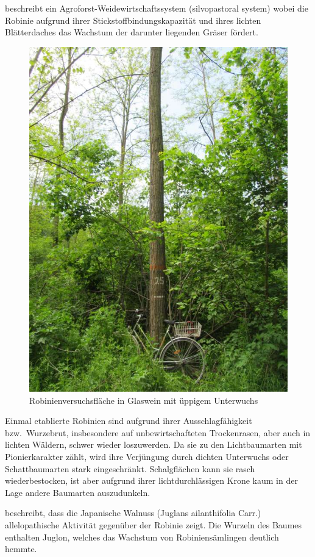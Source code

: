 \documentclass[twocolumn]{scrartcl}
\begin{document}
\citet[p.\,467, 586]{ashton2018silviculture} beschreibt ein
Agroforst-Weidewirtschaftssystem (silvopastoral system) wobei die
Robinie aufgrund ihrer Stickstoffbindungskapazität und ihres lichten
Blätterdaches das Wachstum der darunter liegenden Gräser fördert.

\begin{figure}[htbp]
  \centering
  \includegraphics[width=.9\linewidth]{./bild/GlasweinRobinie2023a}
  \caption{Robinienversuchsfläche in Glaswein mit üppigem Unterwuchs}
  \label{fig:glaswein}
\end{figure}

Einmal etablierte Robinien sind aufgrund ihrer Ausschlagfähigkeit
bzw.\ Wurzebrut, insbesondere auf unbewirtschafteten Trockenrasen, aber
auch in lichten Wäldern, schwer wieder loszuwerden. Da sie zu den
Lichtbaumarten mit Pionierkarakter zählt, wird ihre Verjüngung durch
dichten Unterwuchs oder Schattbaumarten stark
eingeschränkt. Schalgflächen kann sie rasch wiederbestocken, ist aber
aufgrund ihrer lichtdurchlässigen Krone kaum in der Lage andere
Baumarten auszudunkeln.

\cite{jung2010robinie} beschreibt, dass die Japanische Walnuss (Juglans
ailanthifolia Carr.) allelopathische Aktivität gegenüber der Robinie
zeigt. Die Wurzeln des Baumes enthalten Juglon, welches das Wachstum
von Robiniensämlingen deutlich hemmte.
\end{document}
